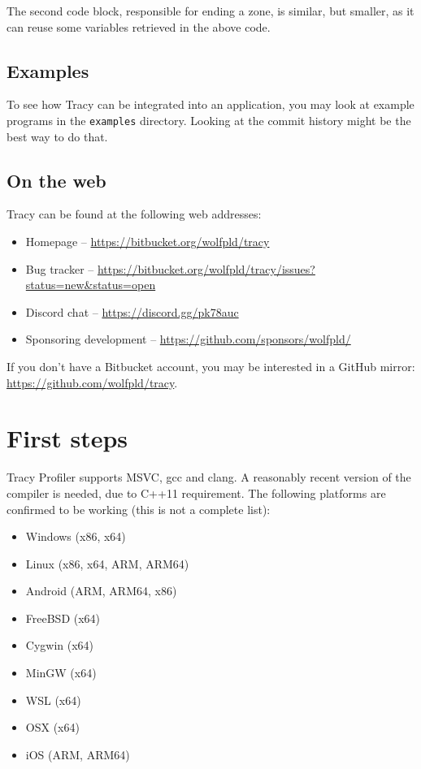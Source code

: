 \documentclass[hidelinks,titlepage,a4paper]{article}
\begin{document}
The second code block, responsible for ending a zone, is similar, but smaller, as it can reuse some variables retrieved in the above code.

\subsection{Examples}

To see how Tracy can be integrated into an application, you may look at example programs in the \texttt{examples} directory. Looking at the commit history might be the best way to do that.

\subsection{On the web}

Tracy can be found at the following web addresses:

\begin{itemize}
\item Homepage -- \url{https://bitbucket.org/wolfpld/tracy}
\item Bug tracker -- \url{https://bitbucket.org/wolfpld/tracy/issues?status=new&status=open}
\item Discord chat -- \url{https://discord.gg/pk78auc}
\item Sponsoring development -- \url{https://github.com/sponsors/wolfpld/}
\end{itemize}

If you don't have a Bitbucket account, you may be interested in a GitHub mirror: \url{https://github.com/wolfpld/tracy}.

\section{First steps}

Tracy Profiler supports  MSVC, gcc and clang. A reasonably recent version of the compiler is needed, due to C++11 requirement. The following platforms are confirmed to be working (this is not a complete list):

\begin{itemize}
\item Windows (x86, x64)
\item Linux (x86, x64, ARM, ARM64)
\item Android (ARM, ARM64, x86)
\item FreeBSD (x64)
\item Cygwin (x64)
\item MinGW (x64)
\item WSL (x64)
\item OSX (x64)
\item iOS (ARM, ARM64)
\end{itemize}
\end{document}
